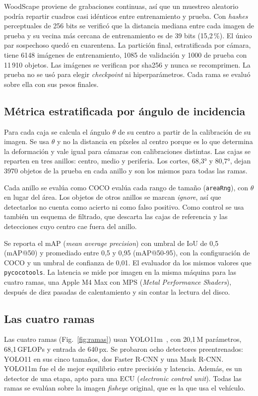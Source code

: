 \documentclass[conference]{IEEEtran}
\begin{document}
WoodScape proviene de grabaciones continuas, así que un muestreo aleatorio podría repartir cuadros casi idénticos entre entrenamiento y prueba. Con \textit{hashes} perceptuales de 256 bits se verificó que la distancia mediana entre cada imagen de prueba y su vecina más cercana de entrenamiento es de 39 bits (15,2\,\%). El único par sospechoso quedó en cuarentena. La partición final, estratificada por cámara, tiene 6148 imágenes de entrenamiento, 1085 de validación y 1000 de prueba con 11\,910 objetos. Las imágenes se verifican por sha256 y nunca se recomprimen. La prueba no se usó para elegir \textit{checkpoint} ni hiperparámetros. Cada rama se evaluó sobre ella con sus pesos finales.

\subsection{Métrica estratificada por ángulo de incidencia}
Para cada caja se calcula el ángulo $\theta$ de su centro a partir de la calibración de su imagen. Se usa $\theta$ y no la distancia en píxeles al centro porque es lo que determina la deformación y vale igual para cámaras con calibraciones distintas. Las cajas se reparten en tres anillos: centro, medio y periferia. Los cortes, 68,3° y 80,7°, dejan 3970 objetos de la prueba en cada anillo y son los mismos para todas las ramas.

Cada anillo se evalúa como COCO evalúa cada rango de tamaño (\texttt{areaRng}), con $\theta$ en lugar del área. Los objetos de otros anillos se marcan \textit{ignore}, así que detectarlos no cuenta como acierto ni como falso positivo. Como control se usa también un esquema de filtrado, que descarta las cajas de referencia y las detecciones cuyo centro cae fuera del anillo.

Se reporta el mAP (\textit{mean average precision}) con umbral de IoU de 0,5 (mAP@50) y promediado entre 0,5 y 0,95 (mAP@50-95), con la configuración de COCO y un umbral de confianza de 0,01. El evaluador da los mismos valores que \texttt{pycocotools}. La latencia se mide por imagen en la misma máquina para las cuatro ramas, una Apple M4 Max con MPS (\textit{Metal Performance Shaders}), después de diez pasadas de calentamiento y sin contar la lectura del disco.

\subsection{Las cuatro ramas}
Las cuatro ramas (Fig.~\ref{fig:ramas}) usan YOLO11m~\cite{yolo11}, con 20,1\,M parámetros, 68,1\,GFLOPs y entrada de 640\,px. Se probaron ocho detectores preentrenados: YOLO11 en sus cinco tamaños, dos Faster R-CNN y una Mask R-CNN. YOLO11m fue el de mejor equilibrio entre precisión y latencia. Además, es un detector de una etapa, apto para una ECU (\textit{electronic control unit}). Todas las ramas se evalúan sobre la imagen \textit{fisheye} original, que es la que usa el vehículo.
\end{document}
